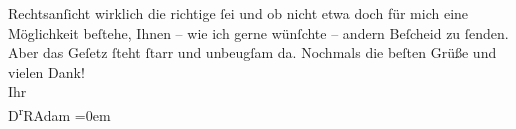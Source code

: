 \begin{ledgroupsized}[t]{13cm}
                    Rechtsanſicht wirklich die richtige ſei und ob nicht etwa doch für mich eine
                    Möglichkeit beſtehe, Ihnen – wie ich gerne wünſchte – andern Beſcheid zu ſenden.
                    Aber {\pb}das Geſetz ſteht ſtarr und
                    unbeugſam da.\pend
           \pstart
           Nochmals die beſten Grüße und vielen Dank!{\\[\baselineskip]}Ihr{\\[\baselineskip]}\spacefill\mbox{D\textsuperscript{r}RAdam}\pend
           \leftskip=0em{}\endnumbering{}\end{ledgroupsized}  \newcommand{\dateiname}{L02357}\newcommand{\titel}{Robert Adam an Arthur Schnitzler, 1. – 3. 11. 1920}\newcommand{\editorInnen}{Martin Anton Müller und Gerd-Hermann Susen}
            \footnotesize
\begin{ledgroupsized}[t]{11.5cm}
\end{ledgroupsized}
         
      